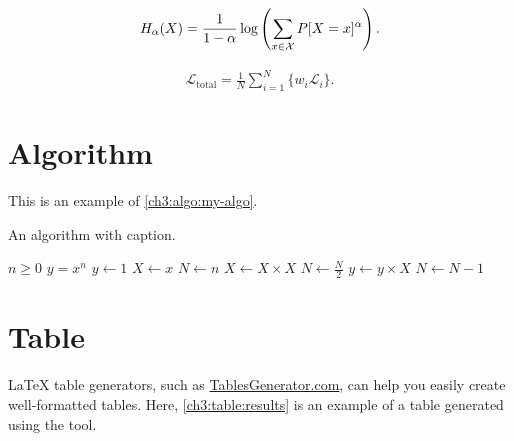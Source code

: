 \begin{equation}
\label{ch3:eq:renyi}
H_{\alpha}(X) =
\frac{1}{1-\alpha}
\log \left(\sum_{x \in {\cal X}}P[X=x]^{\alpha} \right) .
\end{equation}

\begin{equation}
\label{ch3:eq:total-loss}
\begin{aligned}
\mathcal{L}_{\textrm{total}} = \frac{1}{N}\sum_{i=1}^{N}\{w_i\mathcal{L}_i\}.
\end{aligned}
\end{equation}

\section{Algorithm}
\begin{paragraph}
This is an example of \autoref{ch3:algo:my-algo}.
\end{paragraph}

\begin{algorithm}[h]
\caption{An algorithm with caption.}
\label{ch3:algo:my-algo}
\normalsize\singlespacing
\begin{algorithmic}[1] %
    \Require $n \geq 0$
    \Ensure $y = x^n$
    \State $y \gets 1$
    \State $X \gets x$
    \State $N \gets n$
            \State $X \gets X \times X$
            \State $N \gets \frac{N}{2}$ 
            \State $y \gets y \times X$
            \State $N \gets N - 1$
        \EndIf
    \EndWhile
\end{algorithmic}
\end{algorithm}

\section{Table}
\begin{paragraph}
{\LaTeX} table generators, such as \href{https://www.tablesgenerator.com/}{TablesGenerator.com}\footnotemark{}, can help you easily create well-formatted tables.
Here, \autoref{ch3:table:results} is an example of a table generated using the tool.
\end{paragraph}

